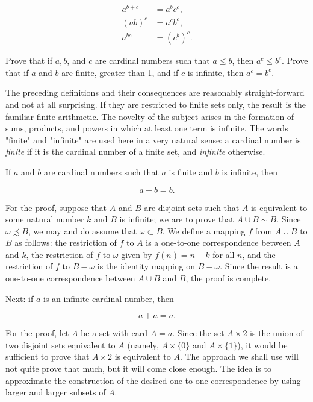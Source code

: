 \begin{align*}
a^{b+c} &= a^{b}c^{c}, \\
(ab)^{c} &= a^{c}b^{c}, \\
a^{bc} &= (c^{b})^{c}. 
\end{align*}

\begin{exercise} Prove that if $a, b$, and $c$ are cardinal numbers such that $a \le b$, then $a^{c} \le b^{c}$. Prove that if $a$ and $b$ are finite, greater than 1, and if $c$ is infinite, then $a^{c} = b^{c}$.
\end{exercise}

The preceding definitions and their consequences are reasonably straight-forward and not at all surprising. If they are restricted to finite sets only, the result is the familiar finite arithmetic. The novelty of the subject arises in the formation of sums, products, and powers in which at least one term is infinite. The words "finite" and "infinite" are used here in a very natural sense: a cardinal number is \textit{finite} if it is the cardinal number of a finite set, and \textit{infinite} otherwise. 

If $a$ and $b$ are cardinal numbers such that $a$ is finite and $b$ is infinite, then 

\begin{equation*}
a + b = b.
\end{equation*}

For the proof, suppose that $A$ and $B$ are disjoint sets such that $A$ is equivalent to some natural number $k$ and $B$ is infinite; we are to prove that $A \cup B \sim B$. Since $\omega \precsim B$, we may and do assume that $\omega \subset B$. We define a mapping $f$ from $A \cup B$ to $B$ as follows: the restriction of $f$ to $A$ is a one-to-one correspondence between $A$ and $k$, the restriction of $f$ to $\omega$ given by $f(n) = n + k$ for all $n$, and the restriction of $f$ to $B - \omega$ is the identity mapping on $B - \omega$. Since the result is a one-to-one correspondence between $A \cup B$ and $B$, the proof is complete. 

Next: if $a$ is an infinite cardinal number, then 

\begin{equation*}
a + a = a. 
\end{equation*}

For the proof, let $A$ be a set with card $A = a$. Since the set $A \times 2$ is the union of two disjoint sets equivalent to $A$ (namely, $A \times \{ 0 \}$ and $A \times \{ 1 \}$), it would be sufficient to prove that $A \times 2$ is equivalent to $A$. The approach we shall use will not quite prove that much, but it will come close enough. The idea is to approximate the construction of the desired one-to-one correspondence by using larger and larger subsets of $A$. 

